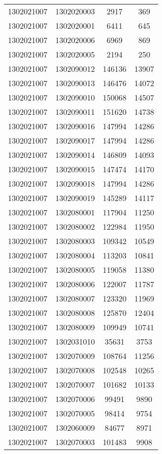 \begin{longtable}[h]{llcc}
		1302021007 & 1302020003 & 2917 & 369\\
		1302021007 & 1302020001 & 6411 & 645\\
		1302021007 & 1302020006 & 6969 & 869\\
		1302021007 & 1302020005 & 2194 & 250\\
		1302021007 & 1302090012 & 146136 & 13907\\
		1302021007 & 1302090013 & 146476 & 14072\\
		1302021007 & 1302090010 & 150068 & 14507\\
		1302021007 & 1302090011 & 151620 & 14738\\
		1302021007 & 1302090016 & 147994 & 14286\\
		1302021007 & 1302090017 & 147994 & 14286\\
		1302021007 & 1302090014 & 146809 & 14093\\
		1302021007 & 1302090015 & 147474 & 14170\\
		1302021007 & 1302090018 & 147994 & 14286\\
		1302021007 & 1302090019 & 145289 & 14117\\
		1302021007 & 1302080001 & 117904 & 11250\\
		1302021007 & 1302080002 & 122984 & 11950\\
		1302021007 & 1302080003 & 109342 & 10549\\
		1302021007 & 1302080004 & 113203 & 10841\\
		1302021007 & 1302080005 & 119058 & 11380\\
		1302021007 & 1302080006 & 122007 & 11787\\
		1302021007 & 1302080007 & 123320 & 11969\\
		1302021007 & 1302080008 & 125870 & 12404\\
		1302021007 & 1302080009 & 109949 & 10741\\
		1302021007 & 1302031010 & 35631 & 3753\\
		1302021007 & 1302070009 & 108764 & 11256\\
		1302021007 & 1302070008 & 102548 & 10265\\
		1302021007 & 1302070007 & 101682 & 10133\\
		1302021007 & 1302070006 & 99491 & 9890\\
		1302021007 & 1302070005 & 98414 & 9754\\
		1302021007 & 1302060009 & 84677 & 8971\\
		1302021007 & 1302070003 & 101483 & 9908\\

\end{longtable}
